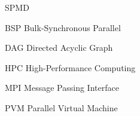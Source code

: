 \begin{listofabbrv}{SPMD}
	\item[BSP] Bulk-Synchronous Parallel
        \item[DAG] Directed Acyclic Graph
        \item[HPC] High-Performance Computing
        \item[MPI] Message Passing Interface
        \item[PVM] Parallel Virtual Machine
\end{listofabbrv}


\listoffigures

\listoftables

\tableofcontents